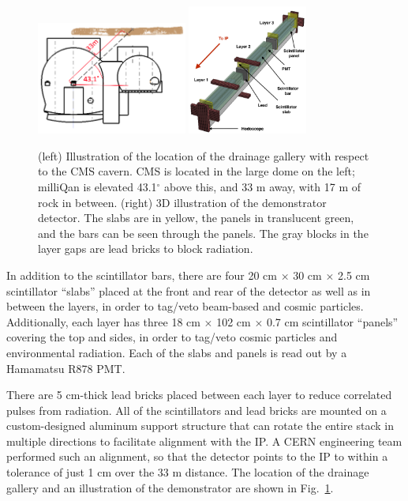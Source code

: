 {\begin{figure}[t]
  \begin{center}
    \includegraphics[width=0.440\textwidth]{figs/milliq/cavern_loc.png}
    \includegraphics[width=0.352\textwidth]{figs/milliq/demonstrator_illustration.png}
    \caption{(left) Illustration of the location of the drainage gallery with 
      respect to the CMS cavern. CMS is located in the large dome on the left; 
      milliQan is elevated 43.1$^\circ$ above this, and 33 m away, with 17 m of
      rock in between. (right) 3D illustration of the demonstrator detector.
      The slabs are in yellow, the panels in translucent green, and the bars can be seen through
      the panels. The gray blocks in the layer gaps are lead bricks to block radiation.
            }
    \label{fig:demonstrator}
  \end{center}
\end{figure}

In addition to the scintillator bars, there are four 20 cm $\times$ 30 cm $\times$ 2.5 cm
scintillator ``slabs'' placed at the front and rear of the detector
as well as in between the layers, in order to tag/veto beam-based and cosmic
particles. Additionally, each layer has three 18 cm $\times$ 102 cm $\times$ 0.7 cm scintillator
``panels'' covering the top and sides, in order to tag/veto cosmic particles and environmental radiation.
Each of the slabs and panels is read out by a Hamamatsu R878 PMT.

There are 5 cm-thick lead bricks placed between each layer to reduce correlated pulses from radiation.
All of the scintillators and lead bricks are mounted on a custom-designed aluminum support structure
that can rotate the entire stack in multiple directions to facilitate alignment with the IP.
A CERN engineering team performed such an alignment, so that the detector points
to the IP to within a tolerance of just 1 cm over the 33 m distance. The location of the drainage gallery
and an illustration of the demonstrator are shown in Fig.~\ref{fig:demonstrator}.

}

